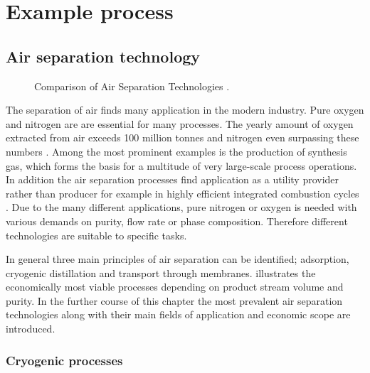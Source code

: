 \chapter{Example process}
\label{chp:airsep}

    \section{Air separation technology}
    \begin{figure}[h]
    	
    	\caption{Comparison of Air Separation Technologies \cite{Prasad.1994}.}
    	\label{fig:tech_compar}
    \end{figure}
    The separation of air finds many application in the modern industry. Pure oxygen and nitrogen are
    are essential for many processes. The yearly amount of oxygen extracted from air exceeds 100 million
    tonnes and nitrogen even surpassing these numbers \cite{Emsley.2003c2001}. Among the most prominent
    examples is the production of synthesis gas,
    which forms the basis for a multitude of very large-scale process operations. In addition the
    air separation processes find application as a utility provider rather than producer
    for example in highly efficient integrated combustion cycles \cite{Mahapatra.2010}. Due to the
    many different applications, pure nitrogen or oxygen is needed with various demands on
    purity, flow rate or phase composition. Therefore different technologies are suitable to specific tasks.
    
    In general three main principles of air separation can be identified; adsorption,
    cryogenic distillation and transport through membranes.  illustrates the
    economically most viable processes depending on product stream volume and purity.
    In the further course of this chapter the most prevalent  air separation technologies
    along with their main fields of application and economic scope are introduced.
    
        \subsection{Cryogenic processes}
        \label{sec:cryo_air_sep}
        
